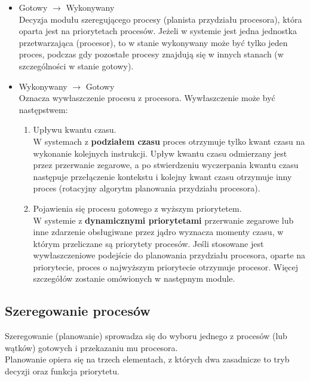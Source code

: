 \documentclass[12pt]{article}
\begin{document}
    \begin{itemize}
        \item Gotowy $\rightarrow$ Wykonywany \\
        Decyzja modułu szeregującego procesy (planista przydziału procesora), która oparta jest na priorytetach procesów. Jeżeli w systemie jest jedna jednostka przetwarzająca (procesor), to w stanie wykonywany może być tylko jeden proces, podczas gdy pozostałe procesy znajdują się w innych stanach (w szczególności w stanie gotowy).
        \item Wykonywany $\rightarrow$ Gotowy \\
        Oznacza wywłaszczenie procesu z procesora. Wywłaszczenie może być następstwem:
        \begin{enumerate}
            \item Upływu kwantu czasu. \\
            W systemach z \textbf{podziałem czasu} proces otrzymuje tylko kwant czasu na wykonanie kolejnych instrukcji.
            Upływ kwantu czasu odmierzany jest przez przerwanie zegarowe, a po stwierdzeniu wyczerpania kwantu czasu następuje przełączenie kontekstu i kolejny kwant czasu otrzymuje inny proces (rotacyjny algorytm planowania przydziału procesora).
            \item Pojawienia się procesu gotowego z wyższym priorytetem.\\
            W systemie z \textbf{dynamicznymi priorytetami} przerwanie zegarowe lub inne zdarzenie obsługiwane przez jądro wyznacza momenty czasu, w którym przeliczane są priorytety procesów. Jeśli stosowane jest wywłaszczeniowe podejście do planowania przydziału procesora, oparte na priorytecie, proces o najwyższym priorytecie otrzymuje procesor. Więcej szczegółów zostanie omówionych w następnym module.
        \end{enumerate}
    \end{itemize}

    \subsection{Szeregowanie procesów}
    
    Szeregowanie (planowanie) sprowadza się do wyboru jednego z procesów (lub wątków) gotowych i przekazaniu mu procesora. \\
    
    Planowanie opiera się na trzech elementach, z których dwa zasadnicze to tryb decyzji oraz funkcja priorytetu.
    
\end{document}
